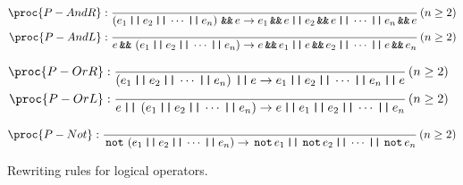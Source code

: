 







\begin{figure*}[htbp!]
\begin{align*}
\proc{P-AndR}:{\over
\p{e_1 \LOR e_2 \LOR \cdots \LOR e_n} \LAND e \rightarrow e_1\LAND e \LOR
e_2\LAND e \LOR \cdots \LOR e_n \LAND e
}\p{n\geq 2}\\
\proc{P-AndL}:{\over
e\LAND\p{e_1 \LOR e_2 \LOR \cdots \LOR e_n} \rightarrow e\LAND e_1 \LOR e\LAND
e_2 \LOR \cdots
\LOR e\LAND e_n
}\p{n\geq 2}
\end{align*}

\begin{align*}
\proc{P-OrR}:{\over
\p{e_1 \LOR e_2 \LOR \cdots \LOR e_n} \LOR e \rightarrow e_1 \LOR e_2 \LOR
\cdots \LOR e_n \LOR e
}\p{n\geq 2}\\
\proc{P-OrL}:{\over
e \LOR \p{e_1 \LOR e_2 \LOR \cdots \LOR e_n} \rightarrow e \LOR e_1 \LOR e_2
\LOR \cdots \LOR e_n
}\p{n\geq 2}
\end{align*}

\begin{align*}
\proc{P-Not}:{\over
\LNOT\p{e_1 \LOR e_2 \LOR \cdots \LOR e_n} \rightarrow \LNOT e_1 \LOR \LNOT e_2
\LOR \cdots \LOR \LNOT e_n
}\p{n\geq 2}
\end{align*}

\caption[]{Rewriting rules for logical operators.}
\label{figure:rewriting-logop}
\end{figure*}

